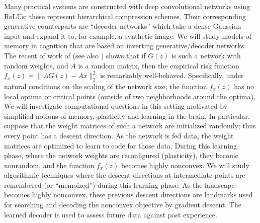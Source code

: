 Many practical systems are constructed with deep convolutional
networks using ReLUs; these represent hierarchical compression
schemes. Their corresponding generative counterparts are ``decoder
networks'' which take a dense Gaussian input and expand it to, for
example, a synthetic image.  We will study models of memory in
cognition that are based on inverting generative/decoder networks. The
recent of work of \cite{HandV17} (see also \cite{HandV18}) shows that
if $G(z)$ is such a network with random weights, and $A$ is a random
matrix, then the empirical risk function $ f_x(z) = \|AG(z) -
Ax\|_2^2$ is remarkably well-behaved. Specifically, under natural
conditions on the scaling of the network size, the function $f_x(z)$
has no local optima or critical points (outside of two neighborhoods
around the optima). We will investigate computational questions in
this setting motivated by simplified notions of memory, plasticity and
learning in the brain. In particular, suppose that the weight matrices
of such a network are initialized randomly; thus every point has a
descent direction. As the network is fed data, the weight matrices are
optimized to learn to code for those data.  During this learning
phase, where the network weights are reconfigured (plasticity), they
become nonrandom, and the function $f_x(z)$ becomes highly
nonconvex. We will study algorithmic techniques where the descent
directions at intermediate points are remembered (or ``memoized'')
during this learning phase. As the landscape becomes highly nonconvex,
these previous descent directions are landmarks used for searching and
decoding the nonconvex objective by gradient descent. The learned
decoder is used to assess future data against past experience.

